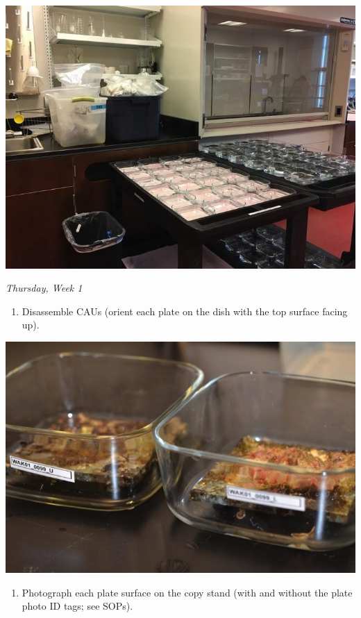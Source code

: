 \documentclass[
]{book}
\providecommand{\tightlist}{%
  \setlength{\itemsep}{0pt}\setlength{\parskip}{0pt}}
\begin{document}
\includegraphics{images/DailyTasks5.jpg}

\emph{Thursday, Week 1}

\begin{enumerate}
\def\labelenumi{\arabic{enumi}.}
\tightlist
\item
  Disassemble CAUs (orient each plate on the dish with the top surface facing up).
\end{enumerate}

\includegraphics{images/DailyTasks6.jpg}

\begin{enumerate}
\def\labelenumi{\arabic{enumi}.}
\setcounter{enumi}{1}
\tightlist
\item
  Photograph each plate surface on the copy stand (with and without the plate photo ID tags; see SOPs).
\end{enumerate}
\end{document}
